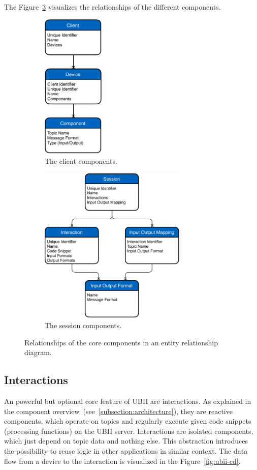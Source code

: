 The Figure~\ref{fig:ubii-er} visualizes the relationships of the different components.

\begin{figure}[htpb]
  \centering
  \begin{subfigure}{.5\textwidth}
    \centering
    \includegraphics[width=3cm]{figures/ubii_er_client.pdf}
    \caption{The client components.}\label{fig:ubii-er-client}
  \end{subfigure}%
  \begin{subfigure}{.5\textwidth}
    \centering
    \includegraphics[width=7cm]{figures/ubii_er_server.pdf}
    \caption{The session components.}\label{fig:ubii-er-server}
  \end{subfigure}
  \caption[UBII components diagram]{Relationships of the core components in an entity relationship diagram.}\label{fig:ubii-er}
\end{figure}


\subsection{Interactions}\label{subsection:interactions}
An powerful but optional core feature of \ac{UBII} are interactions. As explained in the component overview~(see~\ref{subsection:architecture}), they are reactive components, which operate on topics and regularly execute given code snippets (processing functions) on the \ac{UBII} server. Interactions are isolated components, which just depend on topic data and nothing else. This abstraction introduces the possibility to reuse logic in other applications in similar context. The data flow from a device to the interaction is visualized in the Figure~\ref{fig:ubii-cd}.


